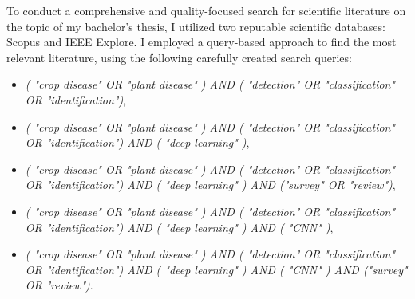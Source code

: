 \documentclass{BachelorBUI}
\begin{document}
To conduct a comprehensive and quality-focused search for scientific literature on the topic of my bachelor's thesis, I utilized two reputable scientific databases: Scopus and IEEE Explore. 
I employed a query-based approach to find the most relevant literature, using the following carefully created search queries: 
\begin{itemize}
    \item \textit{( "crop disease" OR "plant disease" ) AND ( "detection" OR "classification" OR "identification")}, 
    \item \textit{( "crop disease" OR "plant disease" ) AND ( "detection" OR "classification" OR "identification") AND ( "deep learning" )}, 
    \item \textit{( "crop disease" OR "plant disease" ) AND ( "detection" OR "classification" OR "identification") AND ( "deep learning" )  AND ("survey" OR "review")}, 
    \item \textit{( "crop disease" OR "plant disease" ) AND ( "detection" OR "classification" OR "identification") AND ( "deep learning" ) AND ( "CNN" )}, 
    \item \textit{( "crop disease" OR "plant disease" ) AND ( "detection" OR "classification" OR "identification") AND ( "deep learning" ) AND ( "CNN" ) AND ("survey" OR "review")}.
\end{itemize}
\end{document}
